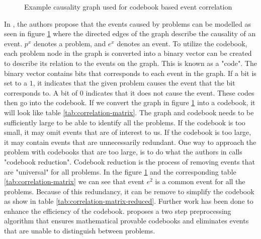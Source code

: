 \begin{figure}[ht]
\centering
{}
\caption{Example causality graph used for codebook based event correlation}
\label{fig:causality-graph-codebook}
\end{figure}

In \cite{yemini_1996}, the authors propose that the events caused by problems can be modelled as seen in figure \ref{fig:causality-graph-codebook} where the directed edges of the graph describe the causality of an event. $p^x$ denotes a problem, and $e^x$ denotes an event. To utilize the codebook, each problem node in the graph is converted into a binary vector can be created to describe its relation to the events on the graph. This is known as a "code". The binary vector contains bits that corresponds to each event in the graph. If a bit is set to a $1$, it indicates that the given problem causes the event that the bit corresponds to. A bit of $0$ indicates that it does not cause the event. These codes then go into the codebook. If we convert the graph in figure \ref{fig:causality-graph-codebook} into a codebook, it will look like table \ref{tab:correlation-matrix}. The graph and codebook needs to be sufficiently large to be able to identify all the problems. If the codebook is too small, it may omit events that are of interest to us. If the codebook is too large, it may contain events that are unnecessarily redundant. One way to approach the problem with codebooks that are too large, is to do what the authors in \cite{yemini_1996} calls "codebook reduction". Codebook reduction is the process of removing events that are "universal" for all problems. In the figure \ref{fig:causality-graph-codebook} and the corresponding table \ref{tab:correlation-matrix} we can see that event $e^2$ is a common event for all the problems. Because of this redundancy, it can be remove to simplify the codebook as show in table \ref{tab:correlation-matrix-reduced}. Further work has been done to enhance the efficiency of the codebook. \cite{gupta_1999} proposes a two step preprocessing algorithm that ensures mathematical provable codebooks and eliminates events that are unable to distinguish between problems.

